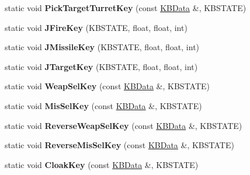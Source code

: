 \begin{DoxyCompactItemize}
\item 
static void {\bfseries Pick\+Target\+Turret\+Key} (const \hyperlink{classKBData}{K\+B\+Data} \&, K\+B\+S\+T\+A\+TE)\hypertarget{classFireKeyboard_a7abb07b7051fcbb393039da0d58265a7}{}\label{classFireKeyboard_a7abb07b7051fcbb393039da0d58265a7}

\item 
static void {\bfseries J\+Fire\+Key} (K\+B\+S\+T\+A\+TE, float, float, int)\hypertarget{classFireKeyboard_a9c2ec503434abffd31e9e4c614c1ee2d}{}\label{classFireKeyboard_a9c2ec503434abffd31e9e4c614c1ee2d}

\item 
static void {\bfseries J\+Missile\+Key} (K\+B\+S\+T\+A\+TE, float, float, int)\hypertarget{classFireKeyboard_a0190a15cd41fc425dbc247aeb3d76e73}{}\label{classFireKeyboard_a0190a15cd41fc425dbc247aeb3d76e73}

\item 
static void {\bfseries J\+Target\+Key} (K\+B\+S\+T\+A\+TE, float, float, int)\hypertarget{classFireKeyboard_aa07b6803a880d1618a71fe035df99c3c}{}\label{classFireKeyboard_aa07b6803a880d1618a71fe035df99c3c}

\item 
static void {\bfseries Weap\+Sel\+Key} (const \hyperlink{classKBData}{K\+B\+Data} \&, K\+B\+S\+T\+A\+TE)\hypertarget{classFireKeyboard_ad4e2802235499aa501cb6b906ff5ad01}{}\label{classFireKeyboard_ad4e2802235499aa501cb6b906ff5ad01}

\item 
static void {\bfseries Mis\+Sel\+Key} (const \hyperlink{classKBData}{K\+B\+Data} \&, K\+B\+S\+T\+A\+TE)\hypertarget{classFireKeyboard_ad2f513620c23d2a7721e89ebbbacb86f}{}\label{classFireKeyboard_ad2f513620c23d2a7721e89ebbbacb86f}

\item 
static void {\bfseries Reverse\+Weap\+Sel\+Key} (const \hyperlink{classKBData}{K\+B\+Data} \&, K\+B\+S\+T\+A\+TE)\hypertarget{classFireKeyboard_af94ab4aeab0f94d497dbf71770371f4d}{}\label{classFireKeyboard_af94ab4aeab0f94d497dbf71770371f4d}

\item 
static void {\bfseries Reverse\+Mis\+Sel\+Key} (const \hyperlink{classKBData}{K\+B\+Data} \&, K\+B\+S\+T\+A\+TE)\hypertarget{classFireKeyboard_a5a00ba4481e93cfc422688108636aa16}{}\label{classFireKeyboard_a5a00ba4481e93cfc422688108636aa16}

\item 
static void {\bfseries Cloak\+Key} (const \hyperlink{classKBData}{K\+B\+Data} \&, K\+B\+S\+T\+A\+TE)\hypertarget{classFireKeyboard_a2f84cba6adbf889d663bead67cdc12ab}{}\label{classFireKeyboard_a2f84cba6adbf889d663bead67cdc12ab}


\end{DoxyCompactItemize}
